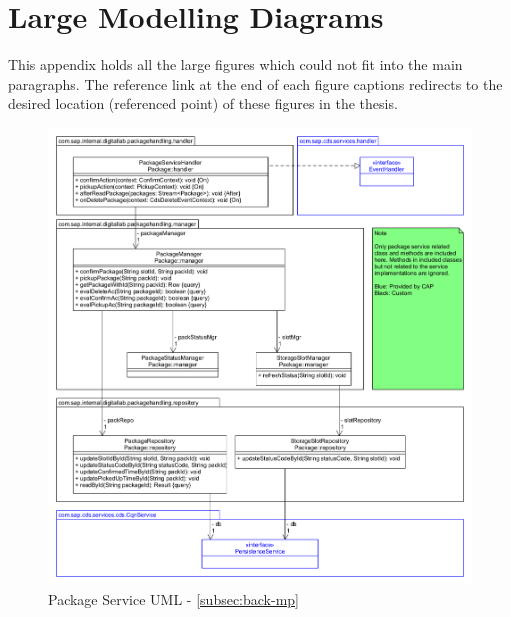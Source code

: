 \chapter{Large Modelling Diagrams}
\label{appx:diagram}

This appendix holds all the large figures which could not fit into the main paragraphs. The reference link at the end of each figure captions redirects to the desired location (referenced point) of these figures in the thesis.

\begin{figure}[!htb]
    \centering
    \includegraphics[width=1\linewidth]{images/service_class_diagrams/package_service_class_diagram.png}
    \caption{Package Service UML - \autoref{subsec:back-mp}}
    \label{fig:package_service_uml}
\end{figure}

